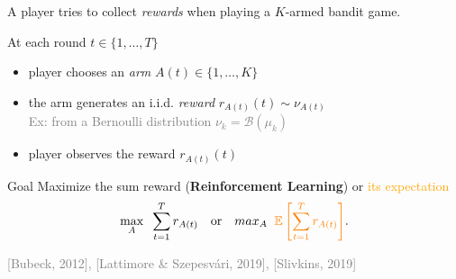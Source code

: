 \begin{frameO}

    A player tries to collect \emph{rewards} when playing a $K$-armed \slotmachine{} bandit game.

    \begin{lightblock}{}
        At each round $t\in\{1,\dots,T\}$
        \begin{itemize}
            \item
                player chooses an \emph{arm} \slotmachine{} \(A(t) \in \{1,\dots,K\}\)
            \item
                the arm generates an i.i.d. \emph{reward} $r_{A(t)}(t) \sim \nu_{A(t)}$\\
                \textcolor{gray}{Ex: from a Bernoulli distribution $\nu_{k} = \mathcal{B}(\mu_k)$}
            \item
                player observes the reward $r_{A(t)}(t)$
        \end{itemize}
    \end{lightblock}

    \pause

    \begin{colorblock}{Goal}
        Maximize the sum reward (\textbf{Reinforcement Learning}) or \textcolor{orange}{its expectation}
        \[\max_{A} \;\; \sum\limits_{t=1}^{T} r_{A(t)} \,\,\,\,\,\, \text{or} \,\,\,\,\,\, max_{A} \;\; \textcolor{orange}{ \mathbb{E}\left[\sum\limits_{t=1}^{T} r_{A(t)}\right] }.\]
    \end{colorblock}

    \vfill{}
    \hfill{} {\small \textcolor{gray}{[Bubeck, 2012], [Lattimore \& Szepesvári, 2019], [Slivkins, 2019]}}

\end{frameO}

